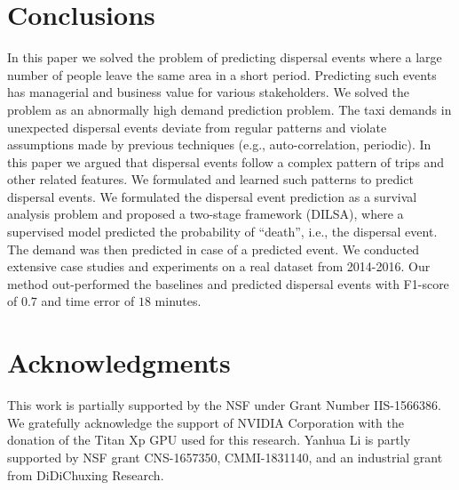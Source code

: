 \documentclass[letterpaper]{article} %
\begin{document}
\section{Conclusions}
\label{conclusion}
In this paper we solved the problem of predicting dispersal events where a large number of people leave the same area in a short period. Predicting such events has managerial and business value for various stakeholders. We solved the problem as an abnormally high demand prediction problem. The taxi demands in unexpected dispersal events deviate from regular patterns and violate assumptions made by previous techniques (e.g., auto-correlation, periodic). In this paper we argued that dispersal events follow a complex pattern of trips and other related features. We formulated and learned such patterns to predict dispersal events. We formulated the dispersal event prediction as a survival analysis problem and proposed a two-stage framework (DILSA), where a supervised model predicted the probability of ``death'', i.e., the dispersal event. The demand was then predicted in case of a predicted event. We conducted extensive case studies and experiments on a real dataset from 2014-2016. Our method out-performed the baselines and predicted dispersal events with F1-score of $0.7$ and time error of $18$ minutes.

\section{Acknowledgments}
This work is partially supported by the NSF under Grant Number IIS-1566386. We gratefully acknowledge the support of NVIDIA Corporation with the donation of the Titan Xp GPU used for this research. Yanhua Li is partly supported by NSF grant CNS-1657350, CMMI-1831140, and an industrial grant from DiDiChuxing Research.
\end{document}
